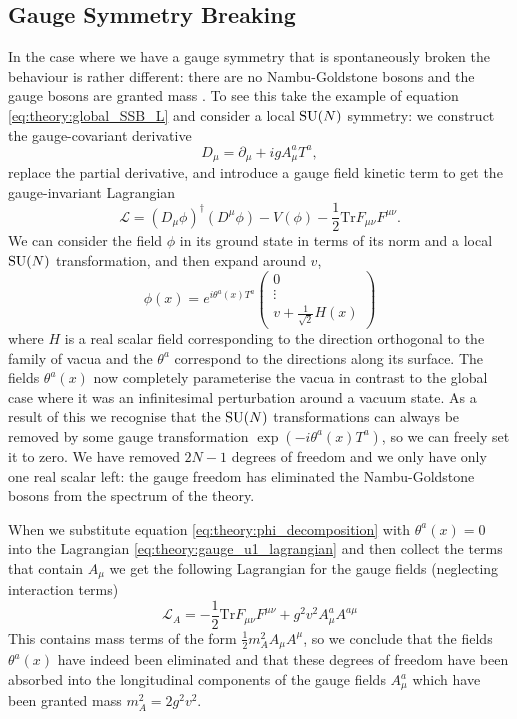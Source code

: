 \subsection{Gauge Symmetry Breaking}
In the case where we have a gauge symmetry that is spontaneously broken the behaviour is rather different: there are no Nambu-Goldstone bosons and the gauge bosons are granted mass \cite{AndersonSSB,BroutEnglert,HiggsPaper,KibbleEtc}. 
To see this take the example of equation \ref{eq:theory:global_SSB_L} and consider a local ${\mathrm{SU}(N)}$ symmetry: we construct the gauge-covariant derivative
%
\begin{equation}
    \label{eq:theory:gauge_cov_deriv_u1}
    D_{\mu} = \partial_{\mu} + igA^{a}_{\mu}T^{a},
\end{equation}
%
replace the partial derivative, and introduce a gauge field kinetic term to get the gauge-invariant Lagrangian
\begin{equation}
    \label{eq:theory:gauge_u1_lagrangian}
    \mathcal{L} = (D_{\mu}\phi)^{\dag}(D^{\mu}\phi) - V(\phi) - \frac{1}{2}\mathrm{Tr}F_{\mu\nu}F^{\mu\nu}.
\end{equation}
%
We can consider the field $\phi$ in its ground state in terms of its norm and a local ${\mathrm{SU}(N)}$ transformation, and then expand around $v$,
\begin{equation}
    \label{eq:theory:phi_decomposition}
    \phi(x) = e^{i\theta^{a}(x)T^{a}}\begin{pmatrix}
        0\\
        \vdots\\
        v + \frac{1}{\sqrt{2}}H(x)
    \end{pmatrix}
\end{equation}
where $H$ is a real scalar field corresponding to the direction orthogonal to the family of vacua and  the $\theta^{a}$ correspond to the directions along its surface. The fields $\theta^{a}(x)$ now completely parameterise the vacua in contrast to the global case where it was an infinitesimal perturbation around a vacuum state.
As a result of this we recognise that the ${\mathrm{SU}(N)}$ transformations can always be removed by some gauge transformation $\exp(-i\theta^{a}(x)T^{a})$, so we can freely set it to zero. 
We have removed $2N-1$ degrees of freedom and we only have only one real scalar left: the gauge freedom has eliminated the Nambu-Goldstone bosons from the spectrum of the theory.


When we substitute equation \ref{eq:theory:phi_decomposition} with $\theta^{a}(x)=0$ into the Lagrangian \ref{eq:theory:gauge_u1_lagrangian} and then collect the terms that contain $A_{\mu}$ we get the following Lagrangian for the gauge fields (neglecting interaction terms)
\begin{equation}
    \label{eq:theory:abelian_gaugefield_L}
    \mathcal{L}_{A} = -\frac{1}{2}\mathrm{Tr}F_{\mu\nu}F^{\mu\nu} + g^{2}v^{2}A^{a}_{\mu}A^{a\mu}
\end{equation}
This contains mass terms of the form $\frac{1}{2}m_{A}^{2}A_{\mu}A^{\mu}$, so we conclude that the fields $\theta^{a}(x)$ have indeed been eliminated and that these degrees of freedom have been absorbed into the longitudinal components of the gauge fields $A^{a}_{\mu}$ which have been granted mass $m_{A}^{2}=2g^{2}v^{2}$. 


